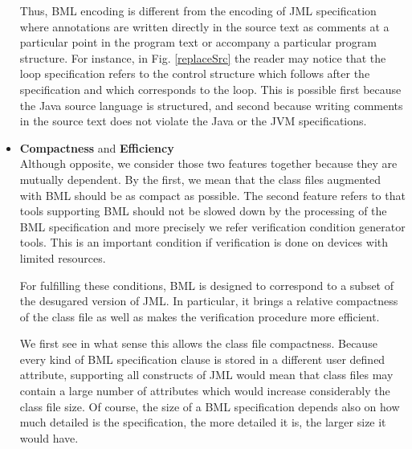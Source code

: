 \begin{itemize}
	    Thus, BML encoding is different from the encoding of   JML specification where
	    annotations are written directly in the source text as comments
	    at a particular point in the program text or accompany a particular program structure. 
	    For instance, in Fig. \ref{replaceSrc} the
	    reader may notice that the loop specification
	    refers to the control structure which follows after the specification and which corresponds to the loop.
	    This is possible first because
	    the Java source language is structured, and second because writing comments in the source text
	    does not violate the Java or the JVM  specifications. 
	  


\item \textbf{Compactness} and \textbf{Efficiency}\\
      Although opposite, we consider those two features together because they are mutually dependent. 
      By the first, we mean that the class files augmented with BML should be as compact as possible.  
      The second feature refers to that tools supporting BML should not be slowed down by the processing
      of the BML specification and more  precisely  we refer verification condition generator tools.
      This is an important condition if verification is done  on devices with limited resources.

      For fulfilling these conditions, BML is designed to correspond to a subset of the desugared version of JML.
      In particular, it brings a relative compactness of the class
      file as well as makes the verification procedure more efficient. 

      We first see in what sense this allows the class file compactness. 
      Because every kind of BML specification clause is
      stored in a different user defined attribute, supporting all constructs of JML would 
      mean that class files may contain a large number of attributes which would increase
      considerably the class file size. Of course, the size of a BML specification depends also 
      on how much detailed is the specification, the more
      detailed it is, the larger size it would have.
      

\end{itemize}
